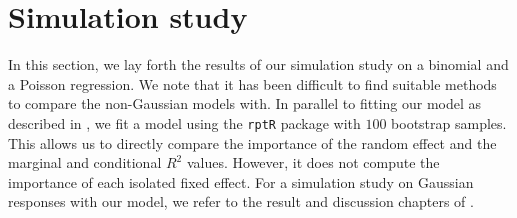 \section{Simulation study}
In this section, we lay forth the results of our simulation study on a binomial and a Poisson regression. We note that it has been difficult to find suitable methods to compare the non-Gaussian models with. In parallel to fitting our model as described in , we fit a model using the \texttt{rptR} package with $100$ bootstrap samples. This allows us to directly compare the importance of the random effect and the marginal and conditional $R^2$ values. However, it does not compute the importance of each isolated fixed effect. For a simulation study on Gaussian responses with our model, we refer to the result and discussion chapters of \citet{Arnstad}. 
